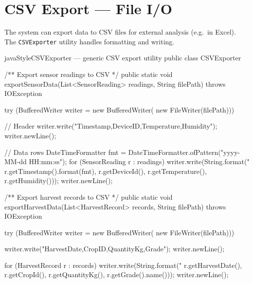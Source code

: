 \documentclass[12pt, a4paper]{report}
\begin{document}
\chapter{CSV Export --- File I/O}

The system can export data to CSV files for external analysis (e.g.\ in Excel). The \texttt{CSVExporter} utility handles formatting and writing.

\begin{codeblock}{javaStyle}{CSVExporter --- generic CSV export utility}
public class CSVExporter {

    /** Export sensor readings to CSV */
    public static void exportSensorData(List<SensorReading> readings,
                                        String filePath) throws IOException {
        try (BufferedWriter writer = new BufferedWriter(
                new FileWriter(filePath))) {
            // Header
            writer.write("Timestamp,DeviceID,Temperature,Humidity");
            writer.newLine();

            // Data rows
            DateTimeFormatter fmt =
                DateTimeFormatter.ofPattern("yyyy-MM-dd HH:mm:ss");
            for (SensorReading r : readings) {
                writer.write(String.format("%
                    r.getTimestamp().format(fmt),
                    r.getDeviceId(),
                    r.getTemperature(),
                    r.getHumidity()));
                writer.newLine();
            }
        }
    }

    /** Export harvest records to CSV */
    public static void exportHarvestData(List<HarvestRecord> records,
                                         String filePath) throws IOException {
        try (BufferedWriter writer = new BufferedWriter(
                new FileWriter(filePath))) {
            writer.write("HarvestDate,CropID,QuantityKg,Grade");
            writer.newLine();

            for (HarvestRecord r : records) {
                writer.write(String.format("%
                    r.getHarvestDate(),
                    r.getCropId(),
                    r.getQuantityKg(),
                    r.getGrade().name()));
                writer.newLine();
            }
        }
    }
}
\end{codeblock}


\end{document}
